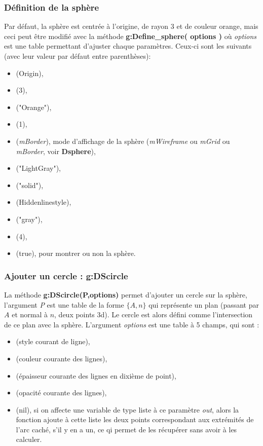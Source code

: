 \subsubsection{Définition de la sphère}
Par défaut, la sphère est centrée à l'origine, de rayon $3$ et de couleur orange, mais ceci peut être modifié avec la méthode \textbf{g:Define\_sphere( options )} où \emph{options} est une table permettant d'ajuster chaque paramètres. Ceux-ci sont les suivants (avec leur valeur par défaut entre parenthèses):
\begin{itemize}
    \item {} (Origin),
    \item {} (3),
    \item {} ("Orange"),
    \item {} (1),
    \item {} (\emph{mBorder}), mode d'affichage de la sphère (\emph{mWireframe} ou \emph{mGrid} ou \emph{mBorder}, voir \textbf{Dsphere}),
    \item {} ("LightGray"),
    \item {} ("solid"),
    \item {} (Hiddenlinestyle),
    \item {} ("gray"),
    \item {} (4),
    \item {} (true), pour montrer ou non la sphère.
\end{itemize}

\subsubsection{Ajouter un cercle : g:DScircle}

La méthode \textbf{g:DScircle(P,options)} permet d'ajouter un cercle sur la sphère, l'argument \emph{P} est une table de la forme $\{A,n\}$ qui représente un plan (passant par $A$ et normal à $n$, deux points 3d). Le cercle est alors défini comme l'intersection de ce plan avec la sphère. L'argument \emph{options} est une table à 5 champs, qui sont :
    \begin{itemize}
        \item {} (style courant de ligne), 
        \item {} (couleur courante des lignes),
        \item {} (épaisseur courante des lignes en dixième de point),
        \item {} (opacité courante des lignes),
        \item {} (nil), si on affecte une variable de type liste à ce paramètre \emph{out}, alors la fonction ajoute à cette liste les deux points correspondant aux extrémités de l'arc caché, s'il y en a un, ce qi permet de les récupérer sans avoir à les calculer.
    \end{itemize}
    
